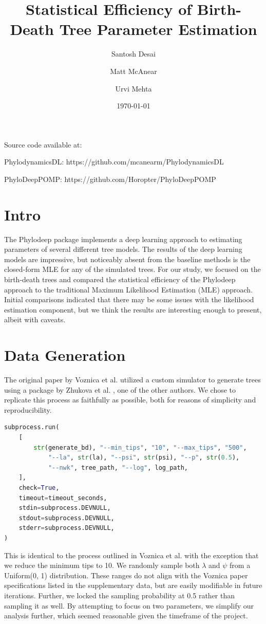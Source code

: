 \documentclass[a4paper]{article}
\title{Statistical Efficiency of Birth-Death Tree Parameter Estimation}
\author{Santosh Desai \and Matt McAnear \and Urvi Mehta}
\date{
	\today
}
\begin{document}
	\maketitle

Source code available at:

PhylodynamicsDL: https://github.com/mcanearm/PhylodynamicsDL

PhyloDeepPOMP: https://github.com/Horopter/PhyloDeepPOMP

\section{Intro}

The Phylodeep package implements a deep learning approach to estimating parameters of several different
tree models. The results of the deep learning models are impressive, but noticeably absent from 
the baseline methods is the closed-form MLE for any of the simulated trees. For our study, we focused on 
the birth-death trees and compared the statistical efficiency of
the Phylodeep approach to the traditional Maximum Likelihood Estimation (MLE) approach. Initial comparisons 
indicated that there may be some issues with the likelihood estimation component, but we think the results
are interesting enough to present, albeit with caveats.

\section{Data Generation}

The original paper by Voznica et al.\cite{voznica_deep_2022} utilized a custom simulator to generate trees using a package by Zhukova et al. \cite{zhukova_evolbioinfotreesimulator_2025},
one of the other authors. We chose to replicate this process as faithfully as possible, both for 
reasons of simplicity and reproducibility.

\begin{lstlisting}[language=Python, caption=Simulator Code]
subprocess.run(
    [
        str(generate_bd), "--min_tips", "10", "--max_tips", "500",
            "--la", str(la), "--psi", str(psi), "--p", str(0.5), 
            "--nwk", tree_path, "--log", log_path,
    ],
    check=True,
    timeout=timeout_seconds,
    stdin=subprocess.DEVNULL,
    stdout=subprocess.DEVNULL,
    stderr=subprocess.DEVNULL,
)
\end{lstlisting}

This is identical to the process outlined in Voznica et al. 
with the exception that we reduce the minimum tips to 10. We randomly sample both $\lambda$ and $\psi$ from a Uniform(0, 1) distribution.
These ranges do not align with the Voznica paper specifications listed in the supplementary data, but are easily modifiable in future iterations. Further,
we locked the sampling probability at 0.5 rather than sampling it as well. By attempting to focus on two parameters, we simplify our analysis further, which seemed reasonable given
the timeframe of the project. 
\end{document}
